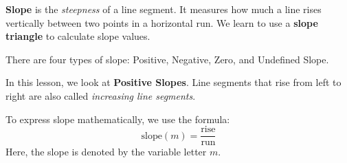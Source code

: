 \documentclass[12pt, a4paper, addpoints]{exam}
\begin{document}
\begin{mdframed}[backgroundcolor=gray!20] %
 \textbf{Slope} is the \textit{steepness} of a line segment. It measures how much a line rises vertically between two points in a horizontal run. We learn to use a \textbf{slope triangle} to calculate slope values.

There are four types of slope: Positive, Negative, Zero, and Undefined Slope.

In this lesson, we look at \textbf{Positive Slopes}. Line segments that rise from left to right are also called \textit{increasing line segments}. 

To express slope mathematically, we use the formula:
\[ \text{slope} (m) = \frac{\text{rise}}{\text{run}} \]
Here, the slope is denoted by the variable letter \(m\).
\end{mdframed}
\end{document}
